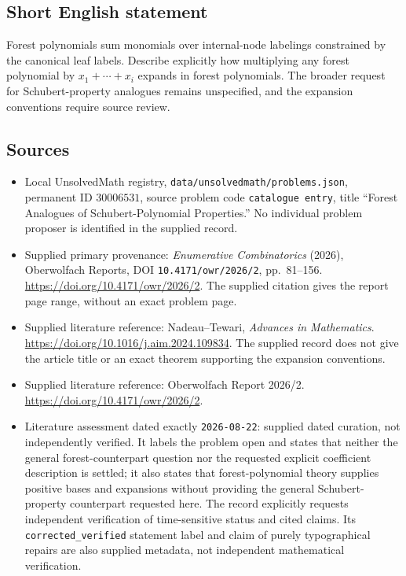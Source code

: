 \documentclass[11pt]{article}
\begin{document}
\subsection{Short English statement}
Forest polynomials sum monomials over internal-node labelings constrained by the canonical leaf labels. Describe explicitly how multiplying any forest polynomial by \(x_1+\cdots+x_i\) expands in forest polynomials. The broader request for Schubert-property analogues remains unspecified, and the expansion conventions require source review.
\subsection{Sources}
\begin{itemize}
\item Local UnsolvedMath registry, \texttt{data/unsolvedmath/problems.json}, permanent ID \(30006531\), source problem code \texttt{catalogue entry}, title ``Forest Analogues of Schubert-Polynomial Properties.'' No individual problem proposer is identified in the supplied record.
\item Supplied primary provenance: \emph{Enumerative Combinatorics} (2026), Oberwolfach Reports, DOI \texttt{10.4171/owr/2026/2}, pp.~81--156. \url{https://doi.org/10.4171/owr/2026/2}. The supplied citation gives the report page range, without an exact problem page.
\item Supplied literature reference: Nadeau--Tewari, \emph{Advances in Mathematics}. \url{https://doi.org/10.1016/j.aim.2024.109834}. The supplied record does not give the article title or an exact theorem supporting the expansion conventions.
\item Supplied literature reference: Oberwolfach Report 2026/2. \url{https://doi.org/10.4171/owr/2026/2}.
\item Literature assessment dated exactly \texttt{2026-08-22}: supplied dated curation, not independently verified. It labels the problem open and states that neither the general forest-counterpart question nor the requested explicit coefficient description is settled; it also states that forest-polynomial theory supplies positive bases and expansions without providing the general Schubert-property counterpart requested here. The record explicitly requests independent verification of time-sensitive status and cited claims. Its \texttt{corrected\_verified} statement label and claim of purely typographical repairs are also supplied metadata, not independent mathematical verification.
\end{itemize}
\end{document}
